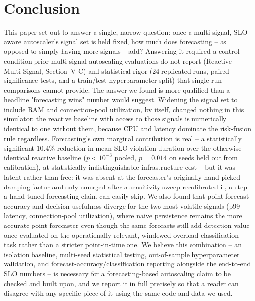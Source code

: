 \documentclass[conference]{IEEEtran}
\begin{document}
\section{Conclusion}

This paper set out to answer a single, narrow question: once a multi-signal, SLO-aware autoscaler's
signal set is held fixed, how much does forecasting -- as opposed to simply having more signals -- add?
Answering it required a control condition prior multi-signal autoscaling evaluations do not report
(Reactive Multi-Signal, Section~V-C) and statistical rigor (24 replicated runs, paired significance
tests, and a train/test hyperparameter split) that single-run comparisons cannot provide. The answer we
found is more qualified than a headline "forecasting wins" number would suggest. Widening the signal set
to include RAM and connection-pool utilization, by itself, changed nothing in this simulator: the
reactive baseline with access to those signals is numerically identical to one without them, because
CPU and latency dominate the risk-fusion rule regardless. Forecasting's own marginal contribution is
real -- a statistically significant $10.4\%$ reduction in mean SLO violation duration over the
otherwise-identical reactive baseline ($p<10^{-3}$ pooled, $p=0.014$ on seeds held out from
calibration), at statistically indistinguishable infrastructure cost -- but it was latent rather than
free: it was absent at the forecaster's originally hand-picked damping factor and only emerged after a
sensitivity sweep recalibrated it, a step a hand-tuned forecasting claim can easily skip. We also found
that point-forecast accuracy and decision usefulness diverge for the two most volatile signals (p99
latency, connection-pool utilization), where naive persistence remains the more accurate point
forecaster even though the same forecasts still add detection value once evaluated on the operationally
relevant, windowed overload-classification task rather than a stricter point-in-time one. We believe
this combination -- an isolation baseline, multi-seed statistical testing, out-of-sample hyperparameter
validation, and forecast-accuracy/classification reporting alongside the end-to-end SLO numbers -- is
necessary for a forecasting-based autoscaling claim to be checked and built upon, and we report it in
full precisely so that a reader can disagree with any specific piece of it using the same code and data
we used.
\end{document}
